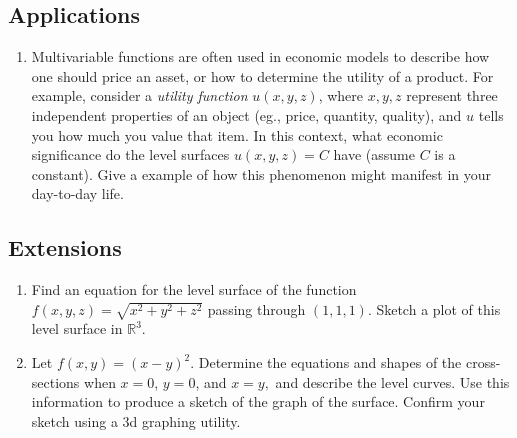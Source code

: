 {\subsection*{Applications}
\begin{enumerate}[resume]
    \item Multivariable functions are often used in economic models to describe how one should price an asset, or how to determine the utility of a product. For example, consider a \textit{utility function} $u(x,y,z)$, where $x,y,z$ represent three independent properties of an object (eg., price, quantity, quality), and $u$ tells you how much you value that item. In this context, what economic significance do the level surfaces $u(x,y,z) = C$ have (assume $C$ is a constant). Give a example of how this phenomenon might manifest in your day-to-day life. 
\end{enumerate}
\subsection*{Extensions}
\begin{enumerate}[resume]
    \item Find an equation for the level surface of the function $f(x,y,z)=\sqrt{x^2+y^2+z^2}$ passing through $(1,1,1)$. Sketch a plot of this level surface in $\mathbb{R}^3$.
    \item Let $f(x,y) = (x-y)^2$. Determine the equations and shapes of the cross-sections when $x = 0$, $y = 0$, and $x = y,$ and describe the level curves. Use this information to produce a sketch of the graph of the surface.  Confirm your sketch using a 3d graphing utility.
\end{enumerate}}{}

